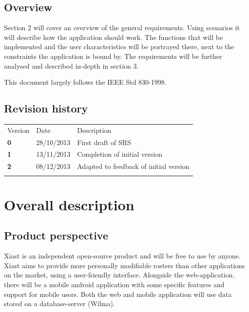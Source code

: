 \documentclass[12pt]{article}
\begin{document}
\subsection{Overview}\label{overview}

Section 2 will cover an overview of the general requirements. Using
scenarios it will describe how the application should work. The
functions that will be implemented and the user characteristics will be
portrayed there, next to the constraints the application is bound by.
The requirements will be further analysed and described in-depth in
section 3.

This document largely follows the IEEE Std 830-1998.

\subsection{Revision history}\label{revision-history}

\begin{longtable}[c]{@{}lll@{}}
\hline\noalign{\medskip}
Version & Date & Description
\\\noalign{\medskip}
\hline\noalign{\medskip}
\textbf{0} & 28/10/2013 & First draft of SRS
\\\noalign{\medskip}
\textbf{1} & 13/11/2013 & Completion of initial version
\\\noalign{\medskip}
\textbf{2} & 08/12/2013 & Adapted to feedback of initial version
\\\noalign{\medskip}
\hline
\end{longtable}

\section{Overall description}\label{overall-description}

\subsection{Product perspective}\label{product-perspective}

Xiast is an independent open-source product and will be free to use by
anyone. Xiast aims to provide more personally modifiable rosters than
other applications on the market, using a user-friendly interface.
Alongside the web-application, there will be a mobile android
application with some specific features and support for mobile users.
Both the web and mobile application will use data stored on a
database-server (Wilma).
\end{document}
